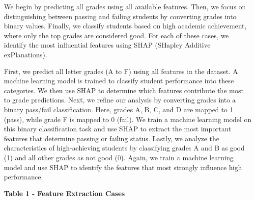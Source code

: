 \begin{multicols}{2}
We begin by predicting all grades using all available features. Then, we
focus on distinguishing between passing and failing students by
converting grades into binary values. Finally, we classify students
based on high academic achievement, where only the top grades are
considered good. For each of these cases, we identify the most
influential features using SHAP (SHapley Additive exPlanations).

First, we predict all letter grades (A to F) using all features in the
dataset. A machine learning model is trained to classify student
performance into these categories. We then use SHAP to determine which
features contribute the most to grade predictions. Next, we refine our
analysis by converting grades into a binary pass/fail classification.
Here, grades A, B, C, and D are mapped to 1 (pass), while grade F is
mapped to 0 (fail). We train a machine learning model on this binary
classification task and use SHAP to extract the most important features
that determine passing or failing status. Lastly, we analyze the
characteristics of high-achieving students by classifying grades A and B
as good (1) and all other grades as not good (0). Again, we train a
machine learning model and use SHAP to identify the features that most
strongly influence high performance.
\end{multicols}

{\bfseries Table 1 - Feature Extraction Cases}


